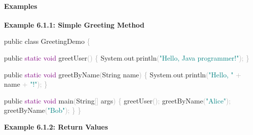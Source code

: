 \documentclass[
  justified,
  openright,
]{tufte-book}
\let\subsubsection\paragraph
\let\paragraph\paragraph
\newcommand{\BuiltInTok}[1]{#1}
\newcommand{\DataTypeTok}[1]{\textcolor{Purple}{#1}}
\newcommand{\FunctionTok}[1]{\textcolor{BrandBlue}{#1}}
\newcommand{\KeywordTok}[1]{\textcolor{BrandBlue}{#1}}
\newcommand{\NormalTok}[1]{#1}
\newcommand{\OperatorTok}[1]{\textcolor{DarkGray}{#1}}
\newcommand{\StringTok}[1]{\textcolor{Teal}{#1}}
\newenvironment{Shaded}{%
  \begin{snugshade}
}{%
  \end{snugshade}
}
\let\subsubsection\paragraph
\let\paragraph\paragraph
\begin{document}
\subsubsection{Examples}\label{examples-6}

\textbf{Example 6.1.1: Simple Greeting Method}

\begin{Shaded}
\begin{Highlighting}[]
\KeywordTok{public} \KeywordTok{class}\NormalTok{ GreetingDemo }\OperatorTok{\{}

    \KeywordTok{public} \DataTypeTok{static} \DataTypeTok{void} \FunctionTok{greetUser}\OperatorTok{()} \OperatorTok{\{}
        \BuiltInTok{System}\OperatorTok{.}\FunctionTok{out}\OperatorTok{.}\FunctionTok{println}\OperatorTok{(}\StringTok{"Hello, Java programmer!"}\OperatorTok{);}
    \OperatorTok{\}}

    \KeywordTok{public} \DataTypeTok{static} \DataTypeTok{void} \FunctionTok{greetByName}\OperatorTok{(}\BuiltInTok{String}\NormalTok{ name}\OperatorTok{)} \OperatorTok{\{}
        \BuiltInTok{System}\OperatorTok{.}\FunctionTok{out}\OperatorTok{.}\FunctionTok{println}\OperatorTok{(}\StringTok{"Hello, "} \OperatorTok{+}\NormalTok{ name }\OperatorTok{+} \StringTok{"!"}\OperatorTok{);}
    \OperatorTok{\}}

    \KeywordTok{public} \DataTypeTok{static} \DataTypeTok{void} \FunctionTok{main}\OperatorTok{(}\BuiltInTok{String}\OperatorTok{[]}\NormalTok{ args}\OperatorTok{)} \OperatorTok{\{}
        \FunctionTok{greetUser}\OperatorTok{();}
        \FunctionTok{greetByName}\OperatorTok{(}\StringTok{"Alice"}\OperatorTok{);}
        \FunctionTok{greetByName}\OperatorTok{(}\StringTok{"Bob"}\OperatorTok{);}
    \OperatorTok{\}}
\OperatorTok{\}}
\end{Highlighting}
\end{Shaded}

\textbf{Example 6.1.2: Return Values}
\end{document}
